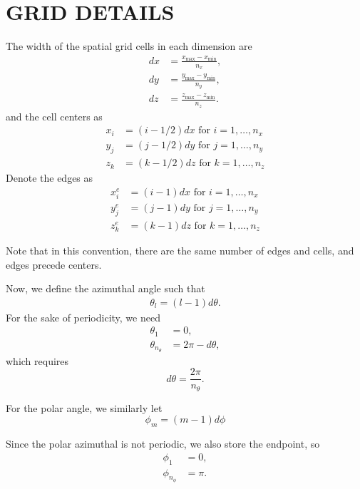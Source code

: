 \chapter{GRID DETAILS}
\label{chap:grid_details}

The width of the spatial grid cells in each dimension are
\begin{align*}
  dx &= \frac{x_{\max}-x_{\min}}{n_x}, \\ 
  dy &= \frac{y_{\max}-y_{\min}}{n_y}, \\ 
  dz &= \frac{z_{\max}-z_{\min}}{n_z}.
\end{align*}
and the cell centers as
\begin{align*}
  x_i &= (i-1/2)dx \mbox{ for } i=1,\ldots,n_x \\
  y_j &= (j-1/2)dy \mbox{ for } j=1,\ldots,n_y \\
  z_k &= (k-1/2)dz \mbox{ for } k=1,\ldots,n_z
\end{align*}
Denote the edges as 
\begin{align*}
  x_i^e &= (i-1)dx \mbox{ for } i=1,\ldots,n_x \\
  y_j^e &= (j-1)dy \mbox{ for } j=1,\ldots,n_y \\
  z_k^e &= (k-1)dz \mbox{ for } k=1,\ldots,n_z 
\end{align*}

Note that in this convention, there are the same number of edges and cells,
and edges precede centers.

Now, we define the azimuthal angle such that
\begin{align*}
  \theta_l = (l-1)d\theta.
\end{align*}
For the sake of periodicity, we need
\begin{align*}
  \theta_1 &= 0, \\
  \theta_{n_\theta} &= 2\pi-d\theta,
\end{align*}
which requires
\begin{equation*}
  d\theta = \frac{2\pi}{n_\theta}.
\end{equation*}

For the polar angle, we similarly let
\begin{equation*}
  \phi_m = (m-1)d\phi
\end{equation*}

Since the polar azimuthal is not periodic, we also store the endpoint, so
\begin{align*}
  \phi_1 &= 0, \\
  \phi_{n_\phi} &= \pi.
\end{align*}


